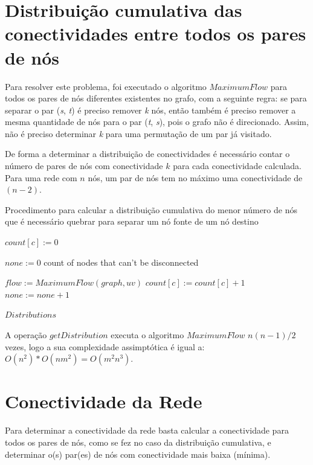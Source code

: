 \documentclass[12pt,a4paper]{article}
\begin{document}
\section{Distribuição cumulativa das conectividades entre todos os pares de nós}

Para resolver este problema, foi executado o algoritmo $MaximumFlow$ para todos os pares de nós diferentes existentes no grafo, com a seguinte regra: se para separar o par (\textit{s}, \textit{t}) é preciso remover \textit{k} nós, então também é preciso remover a mesma quantidade de nós para o par (\textit{t}, \textit{s}), pois o grafo não é direcionado. Assim, não é preciso determinar \textit{k} para uma permutação de um par já visitado.

De forma a determinar a distribuição de conectividades é necessário contar o número de pares de nós com conectividade $k$ para cada conectividade calculada. Para uma rede com $n$ nós, um par de nós tem no máximo uma conectividade de $(n - 2)$. 

\begin{algorithm}
\caption{Procedimento para calcular a distribuição cumulativa do menor número de nós que é necessário quebrar para separar um nó fonte de um nó destino}\label{alg:distribution}
\begin{algorithmic}[1]
    		\State $count[c] := 0$
    \EndFor
    
    \State $none := 0$ \Comment count of nodes that can't be disconnected
		
    		\State $flow := MaximumFlow(graph, uv)$
			\State $count[c] := count[c] + 1$
		\Else
			\State $none := none + 1$
		\EndIf
    \EndFor
    	
  	\Return $Distributions$
\EndProcedure
\end{algorithmic}
\end{algorithm}

A operação $getDistribution$ executa o algoritmo $MaximumFlow$ $n(n-1)/2$ vezes, logo a sua complexidade assimptótica é igual a: $O(n^2) * O(n m^2) = O(m^2 n^3)$.

\section{Conectividade da Rede}

Para determinar a conectividade da rede basta calcular a conectividade para todos os pares de nós, como se fez no caso da distribuição cumulativa, e determinar o(s) par(es) de nós com conectividade mais baixa (mínima).
\end{document}
